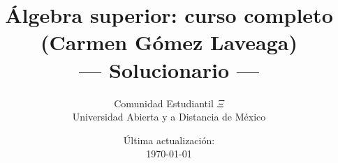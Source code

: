 \documentclass[12pt]{book}
\title{Álgebra superior: curso completo \\ (Carmen Gómez Laveaga) \\ --- Solucionario ---}
\author{Comunidad Estudiantil $\Xi$ \\ Universidad Abierta y a Distancia de México}
\date{Última actualización: \\ \today}
\begin{document}
\maketitle

\newcommand{\solucion}{\underline{Solución} \vspace*{0.2cm}}

\tableofcontents

\setcounter{chapter}{-1}
















\end{document}
